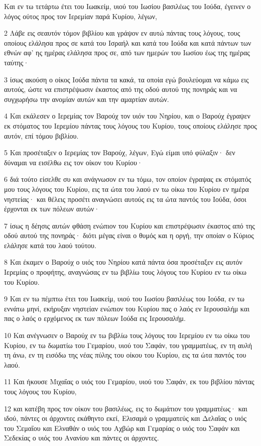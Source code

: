 \par Και εν τω τετάρτω έτει του Ιωακείμ, υιού του Ιωσίου βασιλέως του Ιούδα, έγεινεν ο λόγος ούτος προς τον Ιερεμίαν παρά Κυρίου, λέγων,
\par 2 Λάβε εις σεαυτόν τόμον βιβλίου και γράψον εν αυτώ πάντας τους λόγους, τους οποίους ελάλησα προς σε κατά του Ισραήλ και κατά του Ιούδα και κατά πάντων των εθνών αφ' ης ημέρας ελάλησα προς σε, από των ημερών του Ιωσίου έως της ημέρας ταύτης·
\par 3 ίσως ακούση ο οίκος Ιούδα πάντα τα κακά, τα οποία εγώ βουλεύομαι να κάμω εις αυτούς, ώστε να επιστρέψωσιν έκαστος από της οδού αυτού της πονηράς και να συγχωρήσω την ανομίαν αυτών και την αμαρτίαν αυτών.
\par 4 Και εκάλεσεν ο Ιερεμίας τον Βαρούχ τον υιόν του Νηρίου, και ο Βαρούχ έγραψεν εκ στόματος του Ιερεμίου πάντας τους λόγους του Κυρίου, τους οποίους ελάλησε προς αυτόν, επί τόμου βιβλίου.
\par 5 Και προσέταξεν ο Ιερεμίας τον Βαρούχ, λέγων, Εγώ είμαι υπό φύλαξιν· δεν δύναμαι να εισέλθω εις τον οίκον του Κυρίου·
\par 6 διά τούτο είσελθε συ και ανάγνωσον εν τω τόμω, τον οποίον έγραψας εκ στόματός μου τους λόγους του Κυρίου, εις τα ώτα του λαού εν τω οίκω του Κυρίου εν ημέρα νηστείας· και θέλεις προσέτι αναγνώσει αυτούς εις τα ώτα παντός του Ιούδα, όσοι έρχονται εκ των πόλεων αυτών·
\par 7 ίσως η δέησις αυτών φθάση ενώπιον του Κυρίου και επιστρέψωσιν έκαστος από της οδού αυτού της πονηράς· διότι μέγας είναι ο θυμός και η οργή, την οποίαν ο Κύριος ελάλησε κατά του λαού τούτου.
\par 8 Και έκαμεν ο Βαρούχ ο υιός του Νηρίου κατά πάντα όσα προσέταξεν εις αυτόν Ιερεμίας ο προφήτης, αναγνώσας εν τω βιβλίω τους λόγους του Κυρίου εν τω οίκω του Κυρίου.
\par 9 Και εν τω πέμπτω έτει του Ιωακείμ, υιού του Ιωσίου βασιλέως του Ιούδα, εν τω εννάτω μηνί, εκήρυξαν νηστείαν ενώπιον του Κυρίου πας ο λαός εν Ιερουσαλήμ και πας ο λαός ο ερχόμενος εκ των πόλεων Ιούδα εις Ιερουσαλήμ.
\par 10 Και ανέγνωσεν ο Βαρούχ εν τω βιβλίω τους λόγους του Ιερεμίου εν τω οίκω του Κυρίου, εν τω δωματίω του Γεμαρίου, υιού του Σαφάν, του γραμματέως, εν τη αυλή τη άνω, εν τη εισόδω της νέας πύλης του οίκου του Κυρίου, εις τα ώτα παντός του λαού.
\par 11 Και ήκουσε Μιχαΐας ο υιός του Γεμαρίου, υιού του Σαφάν, εκ του βιβλίου πάντας τους λόγους του Κυρίου,
\par 12 και κατέβη προς τον οίκον του βασιλέως, εις το δωμάτιον του γραμματέως· και ιδού, πάντες οι άρχοντες εκάθηντο εκεί, Ελισαμά ο γραμματεύς και Δελαΐας ο υιός του Σεμαΐου και Ελναθάν ο υιός του Αχβώρ και Γεμαρίας ο υιός του Σαφάν και Σεδεκίας ο υιός του Ανανίου και πάντες οι άρχοντες.

